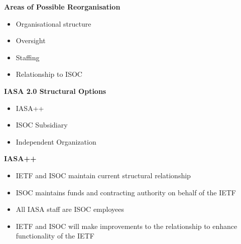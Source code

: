 \documentclass[helvetica]{seminar}
\newcommand{\heading}[1]{%
  \begin{center} 
    \large\bf 
    #1 
  \end{center} 
  \vspace{.4 in}}
\begin{document}
\begin{slide}

\heading{Areas of Possible Reorganisation}
\begin{itemize}
\item Organisational structure
\item Oversight
\item Staffing
\item Relationship to ISOC
\end{itemize}
\end{slide}

\begin{slide}

\heading{IASA 2.0 Structural Options}

\begin{itemize}
\item IASA++
\item ISOC Subsidiary
\item Independent Organization
\end{itemize}

\end{slide}

\begin{slide}

\heading{IASA++}

\begin{itemize}
\item IETF and ISOC maintain current structural relationship
\item ISOC maintains funds and contracting authority on behalf of the IETF
\item All IASA staff are ISOC employees
\item IETF and ISOC will make improvements to the relationship to enhance functionality of the IETF
\end{itemize}

\end{slide}
\end{document}
